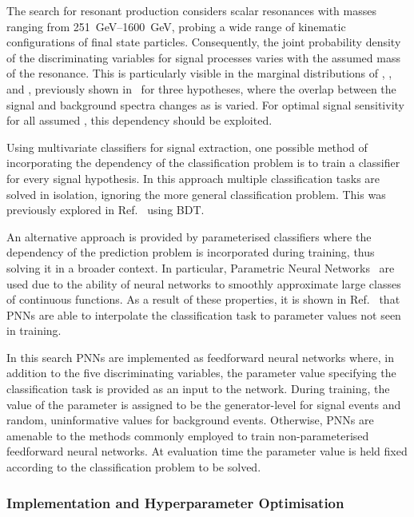 The search for resonant \HH production considers scalar resonances
with masses ranging from \SIrange{251}{1600}{\GeV}, probing a wide
range of kinematic configurations of final state
particles. Consequently, the joint probability density of the
discriminating variables for signal processes varies with the assumed
mass of the resonance. This is particularly visible in the marginal
distributions of \mHH, \dRtautau, and \dRbb, previously shown
in~ for three \mX hypotheses, where the overlap
between the signal and background spectra changes as \mX is
varied. For optimal signal sensitivity for all assumed \mX, this
dependency should be exploited.

Using multivariate classifiers for signal extraction, one possible
method of incorporating the \mX dependency of the classification
problem is to train a classifier for every signal hypothesis. In this
approach multiple classification tasks are solved in isolation,
ignoring the more general classification problem. This was previously
explored in Ref.~\cite{HIGG-2016-16-witherratum} using BDT.

An alternative approach is provided by parameterised classifiers where
the dependency of the prediction problem is incorporated during
training, thus solving it in a broader context. In particular,
Parametric Neural Networks~\cite{Baldi:2016fzo} are used due to the
ability of neural networks to smoothly approximate large classes of
continuous functions. As a result of these properties, it is shown in
Ref.~\cite{Baldi:2016fzo} that PNNs are able to interpolate the
classification task to parameter values not seen in training.

In this search PNNs are implemented as feedforward neural networks
where, in addition to the five discriminating variables, the parameter
value specifying the classification task is provided as an input to
the network. During training, the value of the parameter is assigned
to be the generator-level \mX for signal events and random,
uninformative values for background events. Otherwise, PNNs are
amenable to the methods commonly employed to train non-parameterised
feedforward neural networks. At evaluation time the parameter value is
held fixed according to the classification problem to be solved.


\subsubsection{Implementation and Hyperparameter Optimisation}

